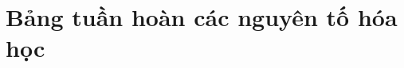 \documentclass[Main.tex]{subfiles}
\begin{document}
	\chapter{Bảng tuần hoàn các nguyên tố hóa học}
	\tatloigiai
	
	
	
	
\end{document}
